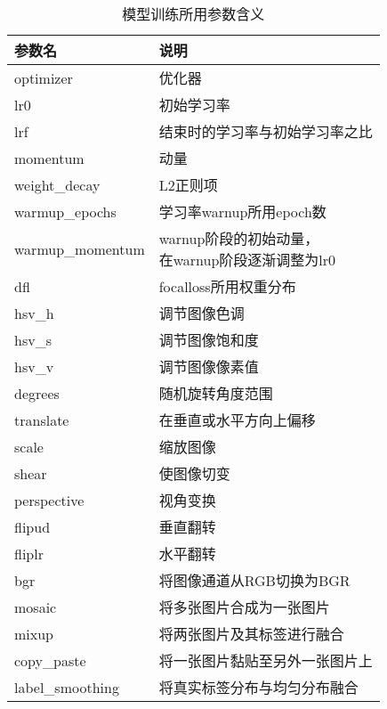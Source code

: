   \begin{table}
    \centering
  \begin{tabular}{ll}\toprule
     参数名&说明\\\midrule
     optimizer&优化器\\
     lr0& 初始学习率\\
     lrf& 结束时的学习率与初始学习率之比\\
     momentum& 动量\\
     weight\_decay& L2正则项\\
     warmup\_epochs& 学习率warnup所用epoch数\\
     warmup\_momentum&\makecell[l]{warnup阶段的初始动量，\\在warnup阶段逐渐调整为lr0}\\
     dfl& focalloss所用权重分布\\
     hsv\_h& 调节图像色调\\
     hsv\_s& 调节图像饱和度\\
     hsv\_v& 调节图像像素值\\
     degrees& 随机旋转角度范围\\
     translate& 在垂直或水平方向上偏移\\
     scale& 缩放图像\\
     shear& 使图像切变\\
     perspective& 视角变换\\
     flipud& 垂直翻转\\
     fliplr& 水平翻转\\
     bgr& 将图像通道从RGB切换为BGR\\
     mosaic& 将多张图片合成为一张图片\\
     mixup& 将两张图片及其标签进行融合\\
     copy\_paste& 将一张图片黏贴至另外一张图片上\\
     label\_smoothing& 将真实标签分布与均匀分布融合\\
     \bottomrule
    \end{tabular}
    \caption{模型训练所用参数含义}
    \end{table}
  
